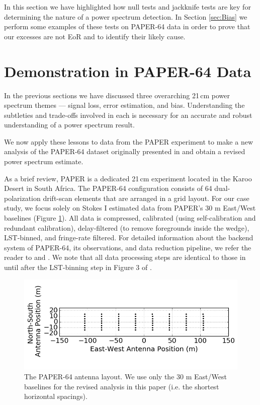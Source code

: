 \documentclass[preprint2,numberedappendix,tighten]{aastex6}  %
\begin{document}
In this section we have highlighted how null tests and jackknife tests are key for determining the nature of a power spectrum 
detection. In Section \ref{sec:Bias} we perform some examples of these tests on PAPER-64 data in order to prove that our 
excesses are not EoR and to identify their likely cause. 


\section{Demonstration in PAPER-64 Data}
\label{sec:CaseStudy}

In the previous sections we have discussed three overarching 21\,cm power spectrum themes --- signal loss, error estimation, 
and bias. Understanding the subtleties and trade-offs involved in each is necessary for an accurate and robust understanding of 
a power spectrum result. 

We now apply these lessons to data from the PAPER experiment to make a new analysis of the PAPER-64 dataset originally presented in 
 and obtain a revised power spectrum estimate.

As a brief review, PAPER is a dedicated 21\,cm experiment located in the Karoo Desert in South Africa. The PAPER-64 
configuration consists of 64 dual-polarization drift-scan elements that are arranged in a grid layout. For our case study, we 
focus solely on Stokes I estimated data \citep{moore_et_al2013} from PAPER's $30$ m East/West baselines (Figure 
\ref{fig:ant_layout}). All data is compressed, calibrated (using self-calibration and redundant calibration), delay-filtered (to remove foregrounds inside the wedge), LST-binned, and fringe-rate filtered. For detailed information about the backend system of PAPER-64, its observations, and data reduction pipeline, we 
refer the reader to \citet{parsons_et_al2010} and . We note that all data processing steps are identical to those in  until after the LST-binning step in Figure 3 of .

\begin{figure}
	\centering
	\includegraphics[trim={0cm 0cm 0cm 0cm},width=\columnwidth]{plots/ant_layout_aspect.png}
	\caption{The PAPER-64 antenna layout. We use only the $30$ m East/West baselines for the revised analysis in this 
paper (i.e. the shortest horizontal spacings).}
	\label{fig:ant_layout}
\end{figure}
\end{document}
